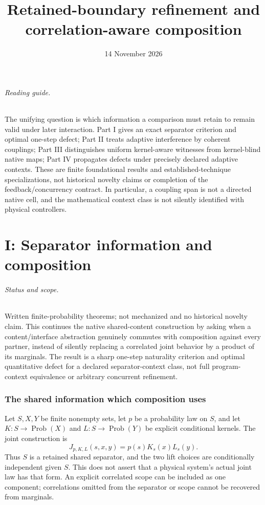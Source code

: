 \documentclass[11pt]{article}
\title{Retained-boundary refinement and correlation-aware composition}
\author{}\date{14 November 2026}
\begin{document}
\maketitle
\paragraph{Reading guide.} The unifying question is which information a comparison must retain to remain valid under later interaction. Part I gives an exact separator criterion and optimal one-step defect; Part II treats adaptive interference by coherent couplings; Part III distinguishes uniform kernel-aware witnesses from kernel-blind native maps; Part IV propagates defects under precisely declared adaptive contexts. These are finite foundational results and established-technique specializations, not historical novelty claims or completion of the feedback/concurrency contract. In particular, a coupling span is not a directed native cell, and the mathematical context class is not silently identified with physical controllers.
\part{I: Separator information and composition}

\paragraph{Status and scope.} Written finite-probability theorems; not mechanized and no historical novelty claim. This continues the native shared-content construction by asking when a content/interface abstraction genuinely commutes with composition against every partner, instead of silently replacing a correlated joint behavior by a product of its marginals. The result is a sharp one-step naturality criterion and optimal quantitative defect for a declared separator-context class, not full program-context equivalence or arbitrary concurrent refinement.

\section{The shared information which composition uses}
Let $S,X,Y$ be finite nonempty sets, let $p$ be a probability law on $S$, and let $K:S\to\operatorname{Prob}(X)$ and $L:S\to\operatorname{Prob}(Y)$ be explicit conditional kernels. The joint construction is
\[
 J_{p,K,L}(s,x,y)=p(s)K_s(x)L_s(y).
\]
Thus $S$ is a retained shared separator, and the two lift choices are conditionally independent given $S$. This does not assert that a physical system's actual joint law has that form. An explicit correlated scope can be included as one component; correlations omitted from the separator or scope cannot be recovered from marginals.
\end{document}
